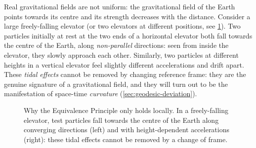 Real gravitational fields are not uniform: the gravitational field of the Earth points towards its centre and its strength decreases with the distance. Consider a large freely-falling elevator (or two elevators at different positions, see \cref{fig:locally}). Two particles initially at rest at the two ends of a horizontal elevator both fall towards the centre of the Earth, along \emph{non-parallel} directions: seen from inside the elevator, they slowly approach each other. Similarly, two particles at different heights in a vertical elevator feel slightly different accelerations and drift apart. These \emph{tidal effects} cannot be removed by changing reference frame: they are the genuine signature of a gravitational field, and they will turn out to be the manifestation of space-time \emph{curvature} (\cref{sec:geodesic-deviation}).

\begin{figure}[ht]
\centering
{}
\caption{Why the Equivalence Principle only holds locally. In a freely-falling elevator, test particles fall towards the centre of the Earth along converging directions (left) and with height-dependent accelerations (right): these tidal effects cannot be removed by a change of frame.}
\label{fig:locally}
\end{figure}

